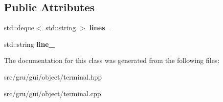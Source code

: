 \subsection*{\-Public \-Attributes}
\begin{DoxyCompactItemize}
\item 
\hypertarget{classglutpp_1_1gui_1_1object_1_1terminal_a7c39f20eb933d89385cd68cbc3fd540c}{std\-::deque$<$ std\-::string $>$ {\bfseries lines\-\_\-}}\label{classglutpp_1_1gui_1_1object_1_1terminal_a7c39f20eb933d89385cd68cbc3fd540c}

\item 
\hypertarget{classglutpp_1_1gui_1_1object_1_1terminal_ac00729aaa825f50b546ce77626c4d650}{std\-::string {\bfseries line\-\_\-}}\label{classglutpp_1_1gui_1_1object_1_1terminal_ac00729aaa825f50b546ce77626c4d650}

\end{DoxyCompactItemize}


\-The documentation for this class was generated from the following files\-:\begin{DoxyCompactItemize}
\item 
src/gru/gui/object/terminal.\-hpp\item 
src/gru/gui/object/terminal.\-cpp\end{DoxyCompactItemize}
